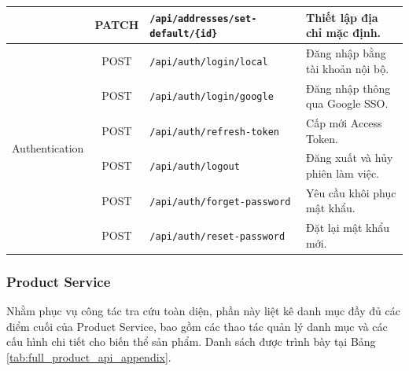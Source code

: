 \begin{table}[H]
\begin{tabular}{|l|c|l|l|}
 & PATCH & \texttt{/api/addresses/set-default/\{id\}} & Thiết lập địa chỉ mặc định. \\ \hline
\multirow{6}{*}{Authentication} & POST & \texttt{/api/auth/login/local} & Đăng nhập bằng tài khoản nội bộ. \\ \cline{2-4} 
 & POST & \texttt{/api/auth/login/google} & Đăng nhập thông qua Google SSO. \\ \cline{2-4} 
 & POST & \texttt{/api/auth/refresh-token} & Cấp mới Access Token. \\ \cline{2-4} 
 & POST & \texttt{/api/auth/logout} & Đăng xuất và hủy phiên làm việc. \\ \cline{2-4} 
 & POST & \texttt{/api/auth/forget-password} & Yêu cầu khôi phục mật khẩu. \\ \cline{2-4} 
 & POST & \texttt{/api/auth/reset-password} & Đặt lại mật khẩu mới. \\ \hline
\end{tabular}
\end{table}

\subsubsection*{Product Service}

Nhằm phục vụ công tác tra cứu toàn diện, phần này liệt kê danh mục đầy đủ các điểm cuối của Product Service, bao gồm các thao tác quản lý danh mục và các cấu hình chi tiết cho biến thể sản phẩm. Danh sách được trình bày tại Bảng \ref{tab:full_product_api_appendix}.

